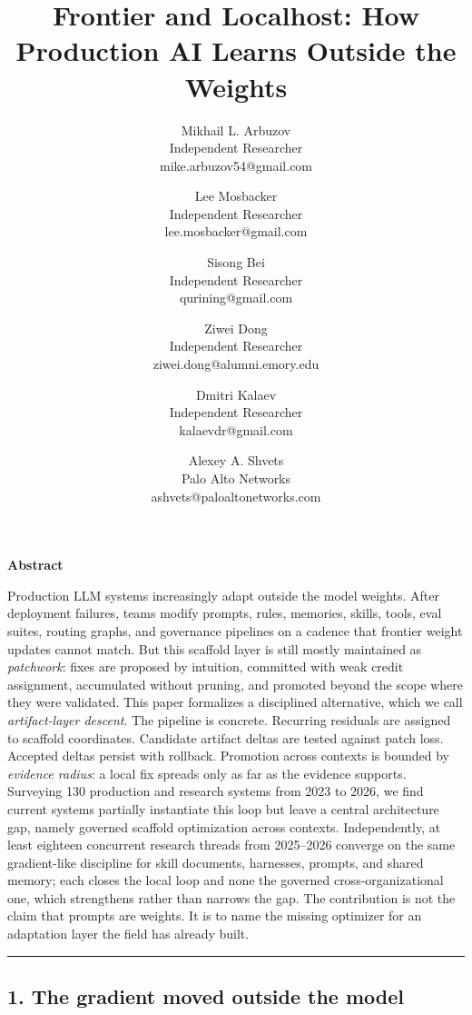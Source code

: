 \documentclass[
]{article}
\title{Frontier and Localhost: How Production AI Learns Outside the
Weights}
\author{Mikhail L. Arbuzov\\
Independent Researcher\\
mike.arbuzov54@gmail.com \and Lee Mosbacker\\
Independent Researcher\\
lee.mosbacker@gmail.com \and Sisong Bei\\
Independent Researcher\\
qurining@gmail.com \and Ziwei Dong\\
Independent Researcher\\
ziwei.dong@alumni.emory.edu \and Dmitri Kalaev\\
Independent Researcher\\
kalaevdr@gmail.com \and Alexey A. Shvets\\
Palo Alto Networks\\
ashvets@paloaltonetworks.com}
\date{}
\newcounter{none} %
\begin{document}
\maketitle

\textbf{Abstract}

Production LLM systems increasingly adapt outside the model weights.
After deployment failures, teams modify prompts, rules, memories,
skills, tools, eval suites, routing graphs, and governance pipelines on
a cadence that frontier weight updates cannot match. But this scaffold
layer is still mostly maintained as \emph{patchwork}: fixes are proposed
by intuition, committed with weak credit assignment, accumulated without
pruning, and promoted beyond the scope where they were validated. This
paper formalizes a disciplined alternative, which we call
\emph{artifact-layer descent}. The pipeline is concrete. Recurring
residuals are assigned to scaffold coordinates. Candidate artifact
deltas are tested against patch loss. Accepted deltas persist with
rollback. Promotion across contexts is bounded by \emph{evidence
radius}: a local fix spreads only as far as the evidence supports.
Surveying 130 production and research systems from 2023 to 2026, we find
current systems partially instantiate this loop but leave a central
architecture gap, namely governed scaffold optimization across contexts.
Independently, at least eighteen concurrent research threads from
2025--2026 converge on the same gradient-like discipline for skill
documents, harnesses, prompts, and shared memory; each closes the local
loop and none the governed cross-organizational one, which strengthens
rather than narrows the gap. The contribution is not the claim that
prompts are weights. It is to name the missing optimizer for an
adaptation layer the field has already built.

\begin{center}\rule{0.5\linewidth}{0.5pt}\end{center}

\subsection{1. The gradient moved outside the
model}\label{the-gradient-moved-outside-the-model}
\end{document}
